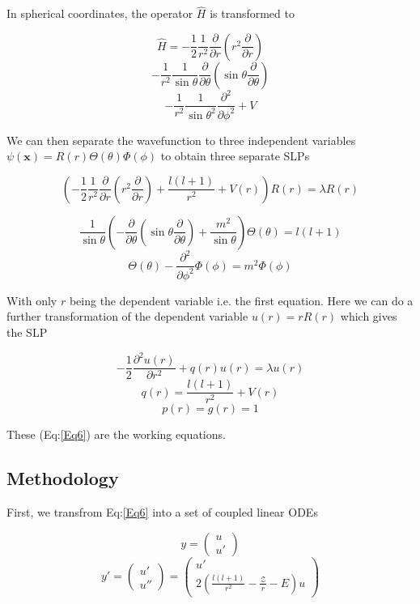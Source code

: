 \documentclass[11pt,a4paper]{article}
\begin{document}
In spherical coordinates, the operator \(\hat{H}\) is transformed to

\[
\hat{H} = -\frac{1}{2}\frac{1}{r^2}\frac{\partial}{\partial r} \left( r^2 \frac{\partial}{\partial r} \right)
\]
\[
   -\frac{1}{r^2}\frac{1}{\sin{\theta}}\frac{\partial}{\partial\theta} \left(\sin{\theta}\frac{\partial}{\partial\theta} \right)
\]
\[
   -\frac{1}{r^2}\frac{1}{\sin{\theta}^2}\frac{\partial^2}{\partial\phi^2} + V
\]

We can then separate the wavefunction to three independent variables
\(\psi(\mathbf{x})=R(r)\Theta(\theta)\Phi(\phi)\) to obtain three separate SLPs

\[
\left (
-\frac{1}{2}\frac{1}{r^2}\frac{\partial}{\partial r} \left( r^2 \frac{\partial}{\partial r} \right) + \frac{l(l+1)}{r^2} + V(r) \right)R(r) = \lambda R(r)
\]

\[
\frac{1}{\sin{\theta}}\left (-\frac{\partial}{\partial \theta} \left( \sin{\theta} \frac{\partial}{\partial \theta} \right)+ \frac{m^2}{\sin{\theta}} \right)\Theta(\theta) = l(l+1)
\]
\[
\Theta(\theta)-\frac{\partial^2}{\partial \phi^2}\Phi(\phi) = m^2 \Phi(\phi)
\]

With only \(r\) being the dependent variable i.e. the first equation.
Here we can do a further transformation of the dependent variable
\(u(r) = r R(r)\) which gives the SLP

\[
-\frac{1}{2}\frac{\partial^2 u(r)}{\partial r^2}+ q(r) u(r) = \lambda u(r)
\]
\[
q(r) = \frac{l(l+1)}{r^2} + V(r)
\]
\[
p(r) = g(r) = 1
\]

These (Eq:\ref{Eq6}) are the working equations.

\subsection{Methodology}
\label{sec:org3a94347}

First, we transfrom Eq:\ref{Eq6} into a set of coupled linear
ODEs

\[
y = \begin{pmatrix} u \\ u' \end{pmatrix}
\]
\[
y' = \begin{pmatrix} u' \\ u'' \end{pmatrix} = \begin{pmatrix} u' \\ 2\left( \frac{l(l+1)}{r^2} -\frac{\mathcal{Z}}{r} - E \right) u \end{pmatrix}
\]
\end{document}
